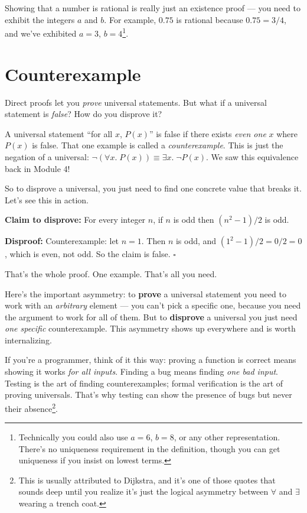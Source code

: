 \documentclass[11pt]{article}
\begin{document}
Showing that a number is rational is really just an existence proof --- you need to exhibit the integers $a$ and $b$. For example, $0.75$ is rational because $0.75 = 3/4$, and we've exhibited $a = 3$, $b = 4$\footnote{Technically you could also use $a = 6$, $b = 8$, or any other representation. There's no uniqueness requirement in the definition, though you can get uniqueness if you insist on lowest terms.}.

\section{Counterexample}

Direct proofs let you \emph{prove} universal statements. But what if a universal statement is \emph{false}? How do you disprove it?

A universal statement ``for all $x$, $P(x)$'' is false if there exists \emph{even one} $x$ where $P(x)$ is false. That one example is called a \emph{counterexample}. This is just the negation of a universal: $\lnot(\forall x.\; P(x)) \equiv \exists x.\; \lnot P(x)$. We saw this equivalence back in Module 4!

So to disprove a universal, you just need to find one concrete value that breaks it. Let's see this in action.

\textbf{Claim to disprove:} For every integer $n$, if $n$ is odd then $(n^2 - 1)/2$ is odd.

\textbf{Disproof:} Counterexample: let $n = 1$. Then $n$ is odd, and $(1^2 - 1)/2 = 0/2 = 0$, which is even, not odd. So the claim is false. \hfill $\square$

That's the whole proof. One example. That's all you need.

Here's the important asymmetry: to \textbf{prove} a universal statement you need to work with an \emph{arbitrary} element --- you can't pick a specific one, because you need the argument to work for all of them. But to \textbf{disprove} a universal you just need \emph{one specific} counterexample. This asymmetry shows up everywhere and is worth internalizing.

If you're a programmer, think of it this way: proving a function is correct means showing it works \emph{for all inputs}. Finding a bug means finding \emph{one bad input}. Testing is the art of finding counterexamples; formal verification is the art of proving universals. That's why testing can show the presence of bugs but never their absence\footnote{This is usually attributed to Dijkstra, and it's one of those quotes that sounds deep until you realize it's just the logical asymmetry between $\forall$ and $\exists$ wearing a trench coat.}.
\end{document}
